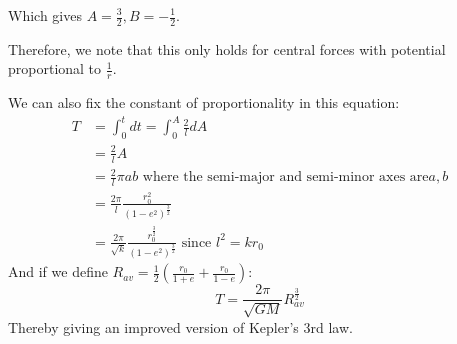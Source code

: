 \documentclass[../Main.tex]{subfiles}
\begin{document}
Which gives $A = \frac{3}{2}, B = -\frac{1}{2}$.\par
Therefore, we note that this only holds for central forces with potential proportional to $\frac{1}{r}$.\par
We can also fix the constant of proportionality in this equation:
\begin{align*}
    T &= \int_0^t dt = \int_0^A \frac{2}{l} dA \\
    &= \frac{2}{l} A \\
    &= \frac{2}{l} \pi a b \text{ where the semi-major and semi-minor axes are} a, b \\
    &= \frac{2\pi}{l} \frac{r_0^2}{(1-e^2)^{\frac{3}{2}}} \\
    &= \frac{2\pi}{\sqrt{k}} \frac{r_0^{\frac{3}{2}}}{(1-e^2)^{\frac{3}{2}}} \text{ since } l^2 = kr_0
\end{align*}
And if we define $R_{av} = \frac{1}{2} \left(\frac{r_0}{1+e} + \frac{r_0}{1-e}\right)$:
\begin{equation}
    T = \frac{2\pi}{\sqrt{GM}} R_{av}^{\frac{3}{2}}
    \label{eqnKepler3Improved}
\end{equation}
Thereby giving an improved version of Kepler's 3rd law.
\end{document}
